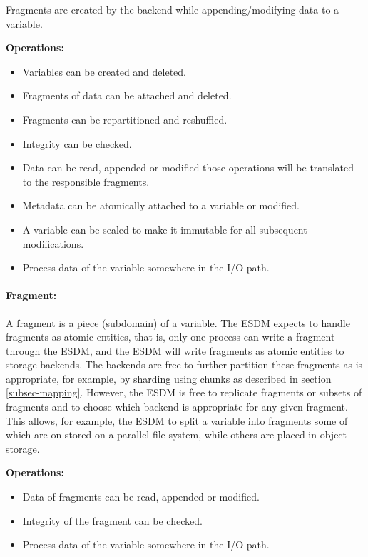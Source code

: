 Fragments are created by the backend while appending/modifying data to a variable.

\textbf{Operations:}
\begin{itemize}
	\item Variables can be created and deleted.
	\item Fragments of data can be attached and deleted.
	\item Fragments can be repartitioned and reshuffled.
	\item Integrity can be checked.
	\item Data can be read, appended or modified those operations will be translated to the responsible fragments.
	\item Metadata can be atomically attached to a variable or modified.
	\item A variable can be sealed to make it immutable for all subsequent modifications.
	\item Process data of the variable somewhere in the I/O-path.
\end{itemize}

\paragraph{Fragment:}  A fragment is a piece (subdomain) of a variable. The ESDM expects to handle fragments as atomic entities, that is, only one process can write  a fragment through the ESDM, and the ESDM will write fragments as atomic entities to storage backends.
The backends are free to further partition these fragments as is appropriate, for example, by sharding using chunks as described in section \ref{subsec-mapping}.
However, the ESDM is free to replicate fragments or subsets of fragments and to choose which backend is appropriate for any given fragment.
This allows, for example, the ESDM to split a variable into fragments some of which are on stored on a parallel file system, while others are placed in object storage.

\textbf{Operations:}
\begin{itemize}
	\item Data of fragments can be read, appended or modified.
	\item Integrity of the fragment can be checked.
	\item Process data of the variable somewhere in the I/O-path.
\end{itemize}

